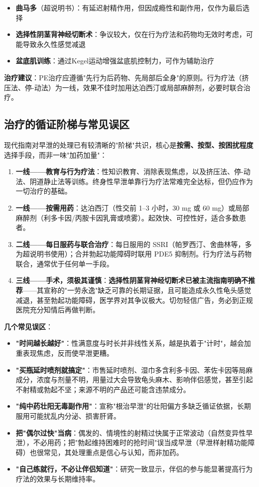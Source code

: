 \documentclass[12pt,a4paper,twoside]{ctexbook}
\begin{document}
\begin{itemize}[leftmargin=2cm]
	\item \textbf{曲马多}（超说明书）：有延迟射精作用，但因成瘾性和副作用，仅作为最后选择
	\item \textbf{选择性阴茎背神经切断术}：争议较大，仅在行为疗法和药物均无效时考虑，可能导致永久性感觉减退
	\item \textbf{盆底肌训练}：通过Kegel运动增强盆底肌控制力，可作为辅助治疗
\end{itemize}

\textbf{治疗建议}：PE治疗应遵循"先行为后药物、先局部后全身"的原则。行为疗法（挤压法、停-动法）为一线，效果不佳时加用达泊西汀或局部麻醉剂，必要时联合治疗。

\subsection{治疗的循证阶梯与常见误区}

现代指南对早泄的处理已有较清晰的"阶梯"共识，核心是\textbf{按需、按型、按困扰程度}选择手段，而非一味"加药加量"：

\begin{enumerate}
	\item \textbf{一线——教育与行为疗法}：性知识教育、消除表现焦虑，以及挤压法、停-动法、阴道静止法等训练。终身性早泄单靠行为疗法常难完全达标，但仍应作为一切治疗的基础。
	\item \textbf{一线——按需用药}：达泊西汀（性交前 1--3 小时，30 mg 或 60 mg）或局部麻醉剂（利多卡因/丙胺卡因乳膏或喷雾）。起效快、可控性好，适合多数患者。
	\item \textbf{二线——每日服药与联合治疗}：每日服用的 SSRI（帕罗西汀、舍曲林等，多为超说明书使用）；合并勃起功能障碍时联用 PDE5 抑制剂。行为疗法与药物联合，通常优于任何单一手段。
	\item \textbf{三线——手术，须极其谨慎}：\textbf{选择性阴茎背神经切断术已被主流指南明确不推荐}——其宣称的"一劳永逸"缺乏可靠的长期证据，且可能造成永久性龟头感觉减退，甚至勃起功能障碍，医学界对其争议极大。切勿轻信广告，务必到正规医院充分知情后再做判断。
\end{enumerate}

\noindent\textbf{几个常见误区}：

\begin{itemize}
	\item \textbf{"时间越长越好"}：性满意度与时长并非线性关系，越是执着于"计时"，越会加重表现焦虑，反而使早泄更糟。
	\item \textbf{"买瓶延时喷剂就搞定"}：市售延时喷剂、湿巾多含利多卡因、苯佐卡因等局麻成分，浓度与剂量不明，用量过大会导致龟头麻木、影响伴侣感觉，甚至引起不射精或勃起不坚；来源不明的产品还可能含违禁成分。
	\item \textbf{"纯中药壮阳无毒副作用"}：宣称"根治早泄"的壮阳偏方多缺乏循证依据，长期服用可能扰乱内分泌、损害肝肾。
	\item \textbf{把"偶尔过快"当病}：偶发的、情境性的射精过快属于正常波动（自然变异性早泄），不必用药；把"勃起维持困难时的抢时间"误当成早泄（早泄样射精功能障碍）也很常见，其处理重点是信心与认知，而非加药。
	\item \textbf{"自己练就行，不必让伴侣知道"}：研究一致显示，伴侣的参与能显著提高行为疗法的效果与长期维持率。
\end{itemize}
\end{document}
